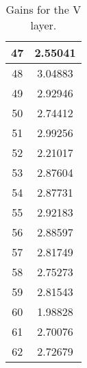\begin{table}[h]
\begin{subtable}[h]{2in}
{\begin{tabular}{|c|c|}
47	&	2.55041	\\	\hline
48	&	3.04883	\\	\hline
49	&	2.92946	\\	\hline
50	&	2.74412	\\	\hline
51	&	2.99256	\\	\hline
52	&	2.21017	\\	\hline
53	&	2.87604	\\	\hline
54	&	2.87731	\\	\hline
55	&	2.92183	\\	\hline
56	&	2.88597	\\	\hline
57	&	2.81749	\\	\hline
58	&	2.75273	\\	\hline
59	&	2.81543	\\	\hline
60	&	1.98828	\\	\hline
61	&	2.70076	\\	\hline
62	&	2.72679	\\	\hline
        \end{tabular}
        }
        \caption{Gains for the V layer.}
    \end{subtable}
    \quad
    \begin{subtable}[h]{2in}
        \centering{}
\end{subtable}
\end{table}
